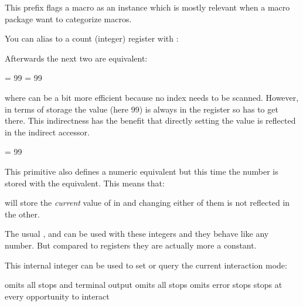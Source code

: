 \startnewprimitive[title={\prm {instance}}]

This prefix flags a macro as an instance which is mostly relevant when a macro
package want to categorize macros.

\stopnewprimitive

\startnewprimitive[title={\prm {integerdef}}]

You can alias to a count (integer) register with :

\starttyping
\countdef{}
\stoptyping

Afterwards the next two are equivalent:

\starttyping
\MyCount   = 99
 = 99
\stoptyping

where \type {\MyCount} can be a bit more efficient because no index needs to be
scanned. However, in terms of storage the value (here 99) is always in the register
so \type {\MyCount} has to get there. This indirectness has the benefit that directly
setting the value is reflected in the indirect accessor.

\starttyping
\integerdef\MyCount = 99
\stoptyping

This primitive also defines a numeric equivalent but this time the number is stored
with the equivalent. This means that:

\starttyping
\let\MyCopyOfCount = \MyCount
\stoptyping

will store the {\em current} value of \type {\MyCount} in \type {\MyCopyOfCount} and
changing either of them is not reflected in the other.

The usual ,  and  can be used with these
integers and they behave like any number. But compared to registers they are actually
more a constant.

\stopnewprimitive

\startoldprimitive[title={\prm {interactionmode}}]

This internal integer can be used to set or query the current interaction mode:

\starttabulate[||||]
\NC \type {\batchmode    } \NC \the\batchmodecode     \NC omits all stops and terminal output \NC \NR
\NC \type {\nonstopmode  } \NC \the\nonstopmodecode   \NC omits all stops \NC \NR
\NC \type {\scrollmode   } \NC \the\scrollmodecode    \NC omits error stops \NC \NR
\NC \type {\errorstopmode} \NC \the\errorstopmodecode \NC stops at every opportunity to interact \NC \NR
\stoptabulate

%

